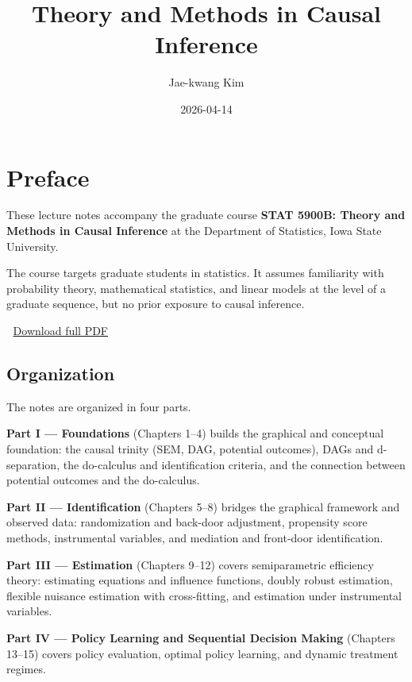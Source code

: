 \documentclass[
  a4paper,
]{book}
\title{Theory and Methods in Causal Inference}
\author{Jae-kwang Kim}
\date{2026-04-14}
\renewcommand{\maketitle}{}
\begin{document}
\frontmatter
\maketitle


\mainmatter
{}

\chapter*{Preface}\label{preface}


These lecture notes accompany the graduate course \textbf{STAT 5900B:
Theory and Methods in Causal Inference} at the Department of Statistics,
Iowa State University.

The course targets graduate students in statistics. It assumes
familiarity with probability theory, mathematical statistics, and linear
models at the level of a graduate sequence, but no prior exposure to
causal inference.

📄 \href{Theory-and-Methods-in-Causal-Inference.pdf}{Download full PDF}

\section*{Organization}\label{organization}


The notes are organized in four parts.

\textbf{Part I --- Foundations} (Chapters 1--4) builds the graphical and
conceptual foundation: the causal trinity (SEM, DAG, potential
outcomes), DAGs and d-separation, the do-calculus and identification
criteria, and the connection between potential outcomes and the
do-calculus.

\textbf{Part II --- Identification} (Chapters 5--8) bridges the
graphical framework and observed data: randomization and back-door
adjustment, propensity score methods, instrumental variables, and
mediation and front-door identification.

\textbf{Part III --- Estimation} (Chapters 9--12) covers semiparametric
efficiency theory: estimating equations and influence functions, doubly
robust estimation, flexible nuisance estimation with cross-fitting, and
estimation under instrumental variables.

\textbf{Part IV --- Policy Learning and Sequential Decision Making}
(Chapters 13--15) covers policy evaluation, optimal policy learning, and
dynamic treatment regimes.
\end{document}
